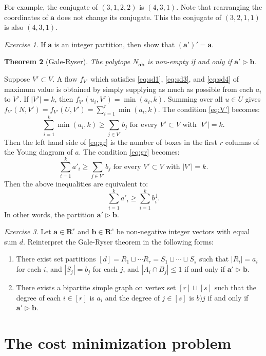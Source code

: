 \documentclass{amsbook}
\newcommand{\bb}{\mathbf b}
\renewcommand{\aa}{\mathbf a}
\newcommand{\RR}{\mathbf R}
\newtheorem{theorem}{Theorem}[section]
\theoremstyle{definition}
\theoremstyle{remark}
\newtheorem{exercise}[theorem]{Exercise}
\begin{document}
For example, the conjugate of $(3, 1, 2, 2)$ is $(4,3,1)$.
Note that rearranging the coordinates of $\aa$ does not change its conjugate.
This the conjugate of $(3,2,1,1)$ is also $(4,3,1)$.
\begin{exercise}
  If $\aa$ is an integer partition, then show that $(\aa')'=\aa$.
\end{exercise}
\begin{theorem}
  [Gale-Ryser]
  \label{theorem:gale-ryser}
  The polytope $N_{\aa\bb}$ is non-empty if and only if $\aa'\rhd \bb$.
\end{theorem}
Suppose $V'\subset V$.
A flow $f_{V'}$ which satisfies \eqref{eq:sd1}, \eqref{eq:sd3}, and \eqref{eq:sd4} of maximum value is obtained by simply supplying as much as possible from each $a_i$ to $V'$.
If $|V'|=k$, then $f_{V'}(u_i,V')=\min(a_i,k)$.
Summing over all $u\in U$ gives $f_{V'}(N,V')=f_{V'}(U,V')=\sum_{i=1}^r\min(a_i,k)$.
The condition \eqref{eq:V'} becomes:
\begin{equation}
  \label{eq:gr}
  \sum_{i=1}^k \min(a_i,k)\geq \sum_{j\in V'} b_j \text{ for every } V'\subset V \text{ with } |V'|=k.
\end{equation}
Then the left hand side of \eqref{eq:gr} is the number of boxes in the first $r$ columns of the Young diagram of $a$.
The condition \eqref{eq:gr} becomes:
\begin{displaymath}
  \sum_{i=1}^k a'_i \geq \sum_{j\in V'}b_j \text{ for every $V'\subset V$ with $|V'|=k$}.
\end{displaymath}
Then the above inequalities are equivalent to:
\begin{displaymath}
  \sum_{i=1}^k a'_i \geq \sum_{i=1}^k b^{\downarrow}_i.
\end{displaymath}
In other words, the partition $\aa'\rhd \bb$.
\begin{exercise}
  Let $\aa\in \RR^r$ and $\bb\in \RR^s$ be non-negative integer vectors with equal sum $d$.
  Reinterpret the Gale-Ryser theorem in the following forms:
  \begin{enumerate}
  \item There exist set partitions $[d]=R_1\sqcup \dotsb R_r=S_1\sqcup\dotsb\sqcup S_s$ such that $|R_i|=a_i$ for each $i$, and $|S_j|=b_j$ for each $j$, and $|A_i\cap B_j|\leq 1$ if and only if $\aa'\rhd \bb$.
  \item There exists a bipartite simple graph on vertex set $[r]\sqcup [s]$ such that the degree of each $i\in [r]$ is $a_i$ and the degree of $j\in [s]$ is $b)j$ if and only if $\aa'\rhd \bb$.
  \end{enumerate}
\end{exercise}
\section{The cost minimization problem}
\label{sec:cost-minim-probl}


\end{document}
